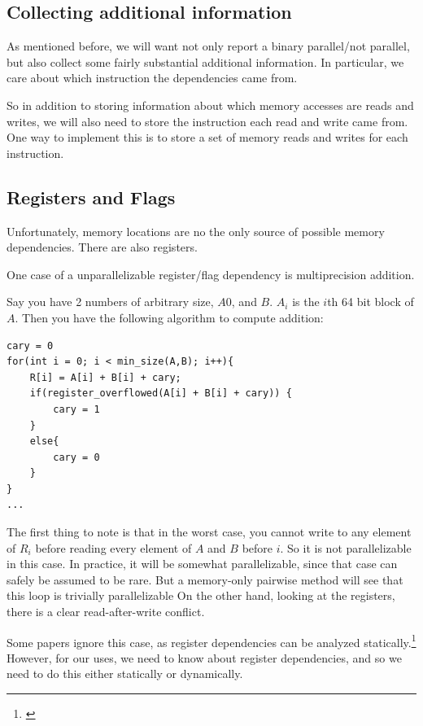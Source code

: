 \documentclass[12pt,twoside]{reedthesis}
\begin{document}
		\subsection{Collecting additional information}

		As mentioned before, we will want not only report a binary parallel/not parallel, but also collect some fairly substantial additional information. In particular, we care about which instruction the dependencies came from.

		So in addition to storing information about which memory accesses are reads and writes, we will also need to store the instruction each read and write came from. One way to implement this is to store a set of memory reads and writes for each instruction.

		\subsection{Registers and Flags}
		Unfortunately, memory locations are no the only source of possible memory dependencies. There are also registers.


		One case of a unparallelizable register/flag dependency is multiprecision addition.

		Say you have 2 numbers of arbitrary size, $A0$, and $B$. $A_i$ is the $i$th 64 bit block of $A$. Then you have the following algorithm to compute addition:

		\begin{lstlisting}
cary = 0
for(int i = 0; i < min_size(A,B); i++){
	R[i] = A[i] + B[i] + cary;
	if(register_overflowed(A[i] + B[i] + cary)) {
		cary = 1
	}
	else{
		cary = 0
	}
}
...
		\end{lstlisting}

		The first thing to note is that in the worst case, you cannot write to any element of $R_i$ before reading every element of $A$ and $B$ before $i$. So it is not parallelizable in this case. In practice, it will be somewhat parallelizable, since that case can safely be assumed to be rare. But a memory-only pairwise method will see that this loop is trivially parallelizable On the other hand, looking at the registers, there is a clear read-after-write conflict.

		Some papers ignore this case, as register dependencies can be analyzed statically.\footnote{\cite{Chen:2004}} However, for our uses, we need to know about register dependencies, and so we need to do this either statically or dynamically.
\end{document}
